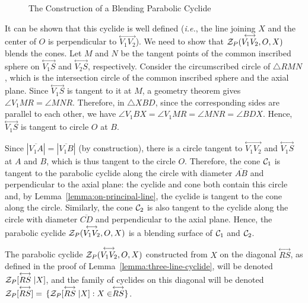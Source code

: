 \begin{figure}
\vspace{5.5cm}
\caption{The Construction of a Blending Parabolic Cyclide}
\label{fig:parabolic-construct}
\end{figure}

It can be shown that this cyclide is well defined ({\em i.e.}, the line 
joining $X$ and the center of $O$ is perpendicular to
$\stackrel{\longleftrightarrow}{V_1V_2}$).
We need to show that \mbox{${\cal Z}_P(\stackrel{\longleftrightarrow}{V_1V_2},O,X)$}
blends the cones.
Let $M$ and $N$ be the tangent points of the common inscribed 
sphere on $\stackrel{\longleftrightarrow}{V_1S}$ and
$\stackrel{\longleftrightarrow}{V_2S}$, respectively.
Consider the circumscribed circle of $\bigtriangleup RMN$, which is the
intersection circle of the common inscribed sphere and the axial plane.
Since $\stackrel{\longleftrightarrow}{V_1S}$ is tangent to it at $M$, a
geometry theorem gives $\angle V_1MR=\angle MNR$.  Therefore, in
$\bigtriangleup XBD$, since the corresponding sides are parallel to each other,
we have $\angle V_1BX=\angle V_1MR=\angle MNR=\angle BDX$. 
Hence, $\stackrel{\longleftrightarrow}{V_1S}$ is tangent to circle $O$ at $B$.

Since $|\overline{V_1A}|=|\overline{V_1B}|$ (by construction),
there is a circle tangent to 
$\stackrel{\longleftrightarrow}{V_1V_2}$ and 
$\stackrel{\longleftrightarrow}{V_1S}$ at $A$ and $B$,
which is thus tangent to the circle $O$.
Therefore, the cone ${\cal C}_1$ is tangent
to the parabolic cyclide along the circle with diameter $\overline{AB}$ and
perpendicular to the axial plane: the cyclide and cone both contain this circle
and, by Lemma~\ref{lemma:on-principal-line}, 
the cyclide is tangent to the cone along the circle.
Similarly, the cone ${\cal C}_2$ is
also tangent to the cyclide along the circle with diameter $\overline{CD}$
and perpendicular to the axial plane.  Hence, the parabolic cyclide
${\cal Z}_P(\stackrel{\longleftrightarrow}{V_1V_2},O,X)$
is a blending surface of ${\cal C}_1$ and ${\cal C}_2$.
\QED

\begin{definition}
The parabolic cyclide ${\cal Z}_P(\stackrel{\longleftrightarrow}{V_1V_2},O,X)$
constructed from $X$ on the diagonal $\stackrel{\longleftrightarrow}{RS}$, 
as defined in the proof of Lemma~\ref{lemma:three-line-cyclide},
will be denoted 
\mbox{${\cal Z}_P[\stackrel{\longleftrightarrow}{RS}|X]$},
and the family of cyclides on this diagonal will be denoted\\
${\cal Z}_P[\stackrel{\longleftrightarrow}{RS}] =$
\mbox{$\{ {\cal Z}_P[\stackrel{\longleftrightarrow}{RS}|X]: X \in 
\stackrel{\longleftrightarrow}{RS}\}$}.
\end{definition}

